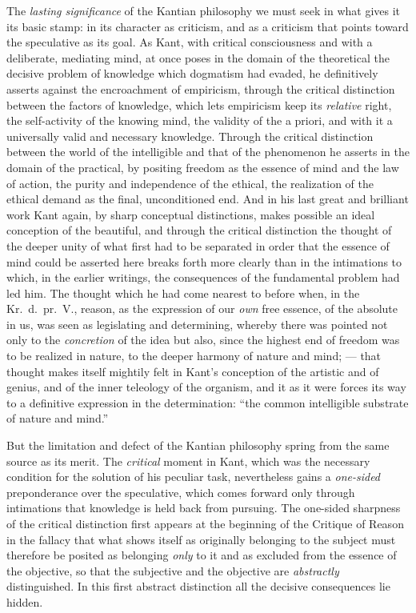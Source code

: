 The \emph{lasting significance} of the Kantian philosophy we must
seek in what gives it its basic stamp: in its character as criticism,
and as a criticism that points toward the speculative as its goal. As
Kant, with critical consciousness and with a deliberate, mediating
mind, at once poses in the domain of the theoretical the decisive
problem of knowledge which dogmatism had evaded, he definitively
asserts against the encroachment of empiricism, through the critical
distinction between the factors of knowledge, which lets empiricism
keep its \emph{relative} right, the self-activity of the knowing mind,
the validity of the a priori, and with it a universally valid and
necessary knowledge. Through the critical distinction between the
world of the intelligible and that of the phenomenon he asserts in the
domain of the practical, by positing freedom as the essence of mind
and the law of action, the purity and independence of the ethical, the
realization of the ethical demand as the final, unconditioned end. And
in his last great and brilliant work Kant again, by sharp
conceptual distinctions, makes possible an ideal conception of the
beautiful, and through the critical distinction the thought of the
deeper unity of what first had to be separated in order
that the essence of mind could be asserted here breaks forth more
clearly than in the intimations to which, in the earlier writings, the
consequences of the fundamental problem had led him. The thought which
he had come nearest to before when, in the Kr.\ d.\ pr.\ V., reason, as
the expression of our \emph{own} free essence, of the absolute in us,
was seen as legislating and determining, whereby there was pointed not
only to the \emph{concretion} of the idea but also, since the highest
end of freedom was to be realized in nature, to the deeper harmony of
nature and mind; --- that thought makes itself mightily felt in Kant's
conception of the artistic and of genius, and of the inner teleology of
the organism, and it as it were forces its way to a definitive
expression in the determination: ``the common intelligible substrate of
nature and mind.''

But the limitation and defect of the Kantian philosophy spring from
the same source as its merit. The \emph{critical} moment in Kant, which
was the necessary condition for the solution of his peculiar task,
nevertheless gains a \emph{one-sided} preponderance over the
speculative, which comes forward only through intimations that
knowledge is held back from pursuing. The one-sided sharpness of the
critical distinction first appears at the beginning of the Critique of
Reason in the fallacy that what shows itself as originally belonging to
the subject must therefore be posited as belonging \emph{only} to it
and as excluded from the essence of the objective, so that the
subjective and the objective are \emph{abstractly} distinguished. In
this first abstract distinction all the decisive consequences lie
hidden.

